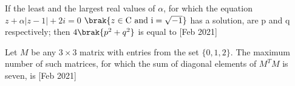 \item If the least and the largest real values of $\alpha$, for which the equation $z+\alpha|z-1|+2i=0$ $\brak{z \in\text{C and i}=\sqrt{-1}}$ has a solution, are p and q respectively; then $4\brak{p^2+q^2}$ is equal to \hfill[Feb 2021]
\item Let $M$ be any $3\times3 $ matrix with entries from the set $\{0,1,2\}$. The maximum number of such matrices, for which the sum of diagonal elements of $M^TM$ is seven, is \hfill[Feb 2021]
